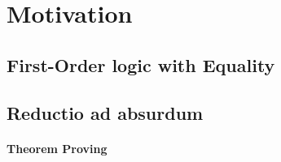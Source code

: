 
\section{Motivation}

\subsection{First-Order logic with Equality}

\begin{frame}
	
\end{frame}

\subsection{Reductio ad absurdum}

\begin{frame}
	\framesubtitle{\FOL{}Theorem Proving}
	
\end{frame}

\begin{frame}
	
\end{frame}

\begin{frame}
	
	
\end{frame}

\begin{frame}
	
\end{frame}
	

